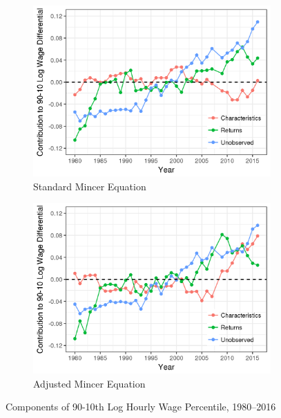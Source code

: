 \documentclass[notitlepage,12pt]{article}
\newcommand{\1}[1]{\ensuremath{\mathbb{1}\left( #1 \right)}}               %
\begin{document}
\begin{figure}[h]
  \centering
  \begin{subfigure}{.5\textwidth}
    \centering
    \includegraphics[width=\textwidth, height = 0.8\textwidth]{figures/edit1.png}
    \caption{Standard Mincer Equation}
  \end{subfigure}%
  \begin{subfigure}{.5\textwidth}
    \centering
    \includegraphics[width=\textwidth, height = 0.8\textwidth]{figures/edit2.png}
    \caption{Adjusted Mincer Equation}
  \end{subfigure}
  \caption{Components of 90-10th Log Hourly Wage Percentile, 1980--2016}
  \label{fig:components_regression}
\end{figure}
\end{document}

